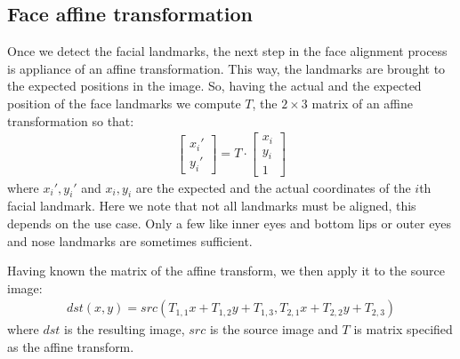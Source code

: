 \subsection{Face affine transformation}
Once we detect the facial landmarks, the next step in the face alignment process is appliance of an affine transformation. This way, the landmarks are brought to the expected positions in the image. So, having the actual and the expected position of the face landmarks we compute $T$, the $2\times3$ matrix of an affine transformation so that:
\begin{align}
	\begin{bmatrix}
	x_{i}'\\
	y_{i}'
	\end{bmatrix}
	=
	T \cdot
	\begin{bmatrix}
	x_{i}\\
	y_{i}\\
	1
	\end{bmatrix}
\end{align}
where $x_{i}', y_{i}'$ and $x_{i}, y_{i}$ are the expected and the actual coordinates of the $i$th facial landmark. Here we note that not all landmarks must be aligned, this depends on the use case. Only a few like inner eyes and bottom lips or outer eyes and nose landmarks are sometimes sufficient.

Having known the matrix of the affine transform, we then apply it to the source image:
\begin{align}
	dst(x, y) = src(T_{1,1}x + T_{1,2}y + T_{1,3}, T_{2,1}x + T_{2,2}y + T_{2,3})
\end{align} where $dst$ is the resulting image, $src$ is the source image and $T$ is matrix specified as the affine transform. 